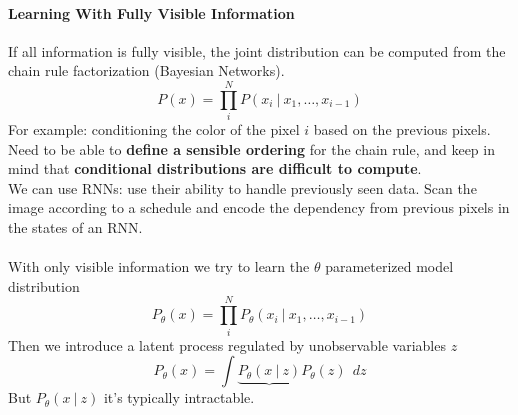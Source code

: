 \documentclass[10pt]{report}
\begin{document}
\paragraph{Learning With Fully Visible Information} If all information is fully visible, the joint distribution can be computed from the chain rule factorization (Bayesian Networks).
$$P(x)=\prod_i^NP(x_i\:|\:x_1,\ldots,x_{i-1})$$
For example: conditioning the color of the pixel $i$ based on the previous pixels.\\
Need to be able to \textbf{define a sensible ordering} for the chain rule, and keep in mind that \textbf{conditional distributions are difficult to compute}.\\
We can use RNNs: use their ability to handle previously seen data. Scan the image according to a schedule and encode the dependency from previous pixels in the states of an RNN.\\\\
With only visible information we try to learn the $\theta$ parameterized model distribution
$$P_\theta(x)=\prod_i^NP_\theta(x_i\:|\:x_1,\ldots,x_{i-1})$$
Then we introduce a latent process regulated by unobservable variables $z$
$$P_\theta(x)=\int \underbrace{P_\theta(x\:|\:z)} P_\theta(z)\:\:dz$$
But $P_\theta(x\:|\:z)$ it's typically intractable.
\end{document}
